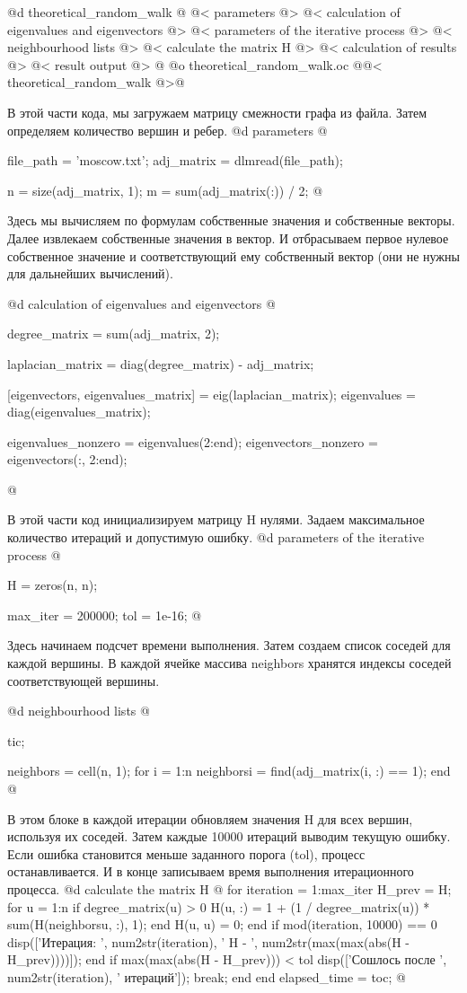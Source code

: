 \documentclass[utf8x]{G7-32} %
\begin{document}
@d theoretical_random_walk @{
@< parameters @>
@< calculation of eigenvalues and eigenvectors @>
@< parameters of the iterative process @>
@< neighbourhood lists @>
@< calculate the matrix H @>
@< calculation of results  @>
@< result output @>
@}
@o theoretical_random_walk.oc @{@< theoretical_random_walk @>@}


В этой части кода, мы загружаем матрицу смежности графа из файла. Затем определяем количество вершин и ребер.
@d parameters @{
file_path = 'moscow.txt';
adj_matrix = dlmread(file_path);

n = size(adj_matrix, 1);
m = sum(adj_matrix(:)) / 2;
@}


Здесь мы вычисляем по формулам собственные значения и собственные векторы. Далее извлекаем собственные значения в вектор. И отбрасываем первое нулевое собственное значение и соответствующий ему собственный вектор (они не нужны для дальнейших вычислений).

@d calculation of eigenvalues and eigenvectors @{
degree_matrix = sum(adj_matrix, 2);

laplacian_matrix = diag(degree_matrix) - adj_matrix;

[eigenvectors, eigenvalues_matrix] = eig(laplacian_matrix);
eigenvalues = diag(eigenvalues_matrix);

eigenvalues_nonzero = eigenvalues(2:end);
eigenvectors_nonzero = eigenvectors(:, 2:end);

@}

В этой части код инициализируем матрицу H нулями. Задаем максимальное количество итераций и допустимую ошибку.
@d parameters of the iterative process @{
H = zeros(n, n);

max_iter = 200000;
tol = 1e-16;
@}


Здесь начинаем подсчет времени выполнения. Затем создаем список соседей для каждой вершины. В каждой ячейке массива neighbors хранятся индексы соседей соответствующей вершины.

@d neighbourhood lists @{
tic;

neighbors = cell(n, 1);
for i = 1:n
    neighbors{i} = find(adj_matrix(i, :) == 1);
end
@}


В этом блоке в каждой итерации обновляем значения H для всех вершин, используя их соседей. Затем каждые 10000 итераций выводим текущую ошибку. Если ошибка становится меньше заданного порога (tol), процесс останавливается. И в конце записываем время выполнения итерационного процесса.
@d calculate the matrix H @{
for iteration = 1:max_iter
    H_prev = H;
    for u = 1:n
        if degree_matrix(u) > 0
            H(u, :) = 1 + (1 / degree_matrix(u)) * sum(H(neighbors{u}, :), 1);
        end
        H(u, u) = 0;  %
    end
    if mod(iteration, 10000) == 0
        disp(['Итерация: ', num2str(iteration), ' H - ', num2str(max(max(abs(H - H_prev))))]);
    end
    if max(max(abs(H - H_prev))) < tol
        disp(['Сошлось после ', num2str(iteration), ' итераций']);
        break;
    end
end
elapsed_time = toc;
@}
\end{document}
